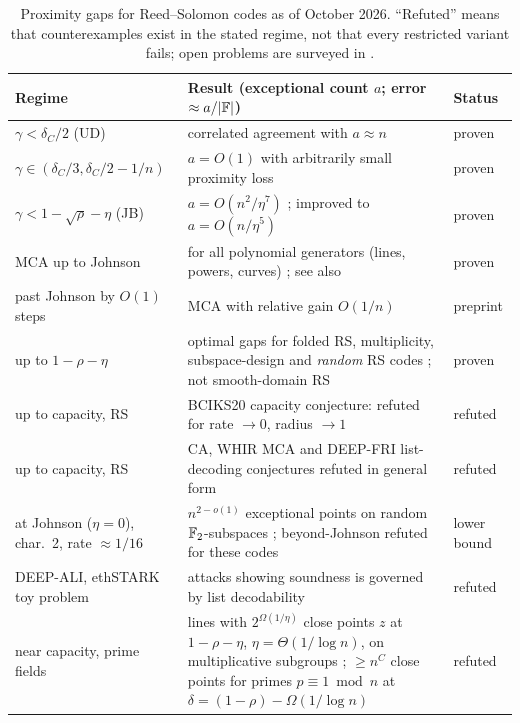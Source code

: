 \begin{table}[t]
\centering\small
\begin{tabularx}{\linewidth}{@{}l>{\raggedright\arraybackslash}Xl@{}}
\toprule
Regime & Result (exceptional count $a$; error $\approx a/|\mathbb{F}|$) & Status \\
\midrule
$\gamma<\delta_C/2$ (UD) & correlated agreement with $a\approx n$ \cite{BCIKS20} & proven \\
$\gamma\in(\delta_C/3,\delta_C/2-1/n)$ & $a=O(1)$ with arbitrarily small proximity loss \cite[Thm.~1.3]{BCHKS25} & proven \\
$\gamma<1-\sqrt\rho-\eta$ (JB) & $a=O(n^2/\eta^7)$ \cite{BCIKS20}; improved to $a=O(n/\eta^5)$ \cite[Thm.~1.5]{BCHKS25} & proven \\
MCA up to Johnson & for all polynomial generators (lines, powers, curves) \cite{BCGM25-MCA}; see also \cite{Hab25-MCA} & proven \\
past Johnson by $O(1)$ steps & MCA with relative gain $O(1/n)$ \cite{Jo26-MCA} & preprint \\
up to $1-\rho-\eta$ & optimal gaps for folded RS, multiplicity, subspace-design and \emph{random} RS codes \cite{GG25,GGSW26}; not smooth-domain RS & proven \\
\midrule
up to capacity, RS & BCIKS20 capacity conjecture: refuted for rate $\to0$, radius $\to1$ \cite{DG25-Dist} & refuted \\
up to capacity, RS & CA, WHIR MCA and DEEP-FRI list-decoding conjectures refuted in general form \cite{CS25-PGC} & refuted \\
at Johnson ($\eta=0$), char.~2, rate $\approx1/16$ & $n^{2-o(1)}$ exceptional points on random $\mathbb{F}_2$-subspaces \cite[Thm.~1.6, Cor.~1.7]{BCHKS25}; beyond-Johnson refuted for these codes & lower bound \\
DEEP-ALI, ethSTARK toy problem & attacks showing soundness is governed by list decodability \cite{BCHKS25} & refuted \\
near capacity, prime fields & lines with $2^{\Omega(1/\eta)}$ close points $z$ at $1-\rho-\eta$, $\eta=\Theta(1/\log n)$, on multiplicative subgroups \cite{KKH26}; $\ge n^{C}$ close points for primes $p\equiv1\bmod n$ at $\delta=(1-\rho)-\Omega(1/\log n)$ \cite{Kam26} & refuted \\
\bottomrule
\end{tabularx}
\caption{Proximity gaps for Reed--Solomon codes as of October 2026. ``Refuted'' means that
counterexamples exist in the stated regime, not that every restricted variant fails; open problems
are surveyed in \cite{ABF26}.}
\label{tab:bg-proximity}
\end{table}

